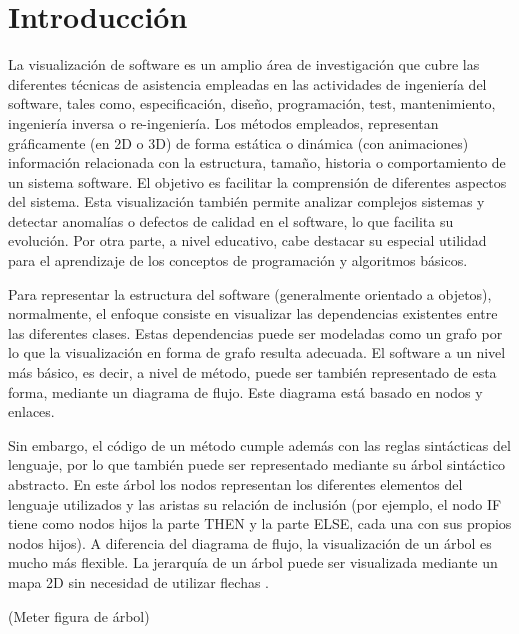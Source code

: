 \documentclass{llncs}
\begin{document}
\section{Introducción}
\label{sec:intro}
La visualización de software es un amplio área de investigación que cubre las diferentes técnicas de asistencia empleadas en las actividades de ingeniería del software, tales como, especificación, diseño, programación, test, mantenimiento, ingeniería inversa o re-ingeniería. Los métodos empleados, representan gráficamente (en 2D o 3D) de forma estática o dinámica (con animaciones) información relacionada con la estructura, tamaño, historia o comportamiento de un sistema software. El objetivo es facilitar la comprensión de diferentes aspectos del sistema. Esta visualización también permite analizar complejos sistemas y detectar anomalías o defectos de calidad en el software, lo que facilita su evolución. Por otra parte, a nivel educativo, cabe destacar su especial utilidad para el aprendizaje de los conceptos de programación y algoritmos básicos.

Para representar la estructura del software (generalmente orientado a objetos), normalmente, el enfoque consiste en visualizar las dependencias existentes entre las diferentes clases. Estas dependencias puede ser modeladas como un grafo por lo que la visualización en forma de grafo resulta adecuada. El software a un nivel más básico, es decir, a nivel de método, puede ser también representado de esta forma, mediante un diagrama de flujo. Este diagrama está basado en nodos y enlaces.

Sin embargo, el código de un método cumple además con las reglas sintácticas del lenguaje, por lo que también puede ser representado mediante su árbol sintáctico abstracto. En este árbol los nodos representan los diferentes elementos del lenguaje utilizados y las aristas su relación de inclusión (por ejemplo, el nodo IF tiene como nodos hijos la parte THEN y la parte ELSE, cada una con sus propios nodos hijos). A diferencia del diagrama de flujo, la visualización de un árbol es mucho más flexible. La jerarquía de un árbol puede ser visualizada mediante un mapa 2D sin necesidad de utilizar flechas \cite{softwarevisualization}.

(Meter figura de árbol)
\end{document}
